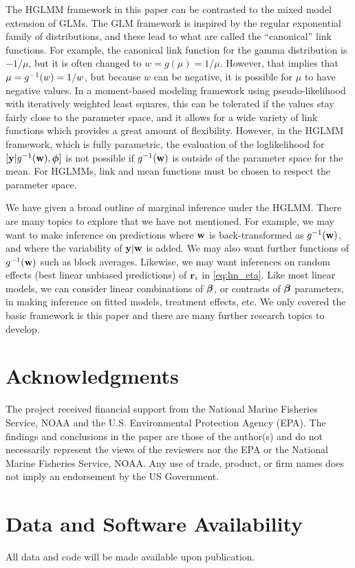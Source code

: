 \documentclass[12pt, titlepage]{article}
\begin{document}
The HGLMM framework in this paper can be contrasted to the mixed model extension of GLMs.  The GLM framework is inspired by the regular exponential family of distributions, and these lead to what are called the ``canonical'' link functions.  For example, the canonical link function for the gamma distribution is $-1/\mu$, but it is often changed to $w = g(\mu) = 1/\mu$.  However, that implies that $\mu = g^{-1}(w) = 1/w$, but because $w$ can be negative, it is possible for $\mu$ to have negative values.  In a moment-based modeling framework using pseudo-likelihood with iteratively weighted least squares, this can be tolerated if the values stay fairly close to the parameter space, and it allows for a wide variety of link functions which provides a great amount of flexibility.  However, in the HGLMM framework, which is fully parametric, the evaluation of the loglikelihood for $[\mathbf{y}|g^{-1}(\mathbf{w}),\boldsymbol{\phi}]$ is not possible if $g^{-1}(\mathbf{w})$ is outside of the parameter space for the mean.  For HGLMMs, link and mean functions must be chosen to respect the parameter space.

We have given a broad outline of marginal inference under the HGLMM.  There are many topics to explore that we have not mentioned.  For example, we may want to make inference on predictions where $\mathbf{w}$ is back-transformed as $g^{-1}(\mathbf{w})$, and where the variability of $\mathbf{y}|\mathbf{w}$ is added.  We may also want further functions of $g^{-1}(\mathbf{w})$ such as block averages.  Likewise, we may want inferences on random effects (best linear unbiased predictions) of $\mathbf{r}_{i}$ in \eqref{eq:lm_eta}.  Like most linear models, we can consider linear combinations of $\boldsymbol{\beta}$, or contrasts of $\boldsymbol{\beta}$ parameters, in making inference on fitted models, treatment effects, etc.  We only covered the basic framework is this paper and there are many further research topics to develop.

\section*{Acknowledgments}
The project received financial support from the National Marine Fisheries Service, NOAA and the U.S. Environmental Protection Agency (EPA).  The findings and conclusions in the paper are those of the author(s) and do not necessarily represent the views of the reviewers nor the EPA or the National Marine Fisheries Service, NOAA. Any use of trade, product, or firm names does not imply an endorsement by the US Government.

\section*{Data and Software Availability}
All data and code will be made available upon publication.
\end{document}
